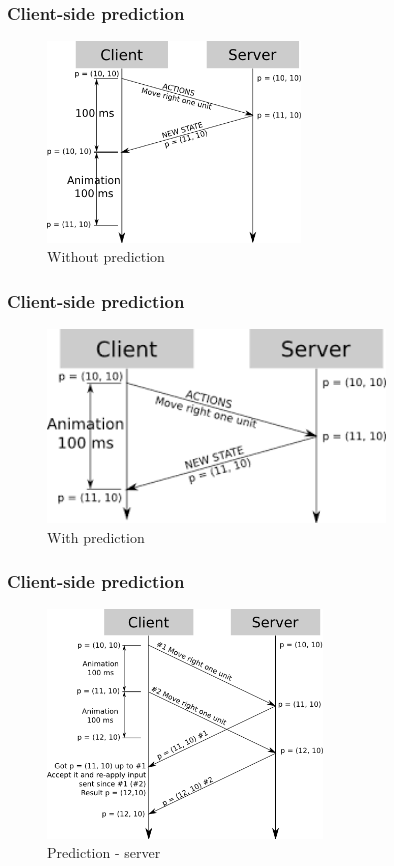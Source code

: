 \documentclass{beamer}
\begin{document}
\begin{frame}
	\frametitle{Client-side prediction}
	\begin{figure}[H]
    	\centering
     \includegraphics[width=0.6\textwidth]{prediction1.png}
     \caption{Without prediction}
     \end{figure}
\end{frame}

\begin{frame}
	\frametitle{Client-side prediction}
	\begin{figure}[H]
    	\centering
     \includegraphics[width=0.8\textwidth]{prediction2.png}
     \caption{With prediction}
     \end{figure}
\end{frame}

\begin{frame}
	\frametitle{Client-side prediction}
	\begin{figure}[H]
    	\centering
     \includegraphics[width=0.65\textwidth]{prediction3.png}
     \caption{Prediction - server}
     \end{figure}
\end{frame}
\end{document}
